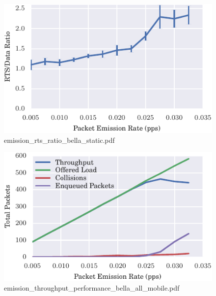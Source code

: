 \documentclass{article}
\begin{document}
\begin{figure}[h!]
\centering
\includegraphics[width=\linewidth]{emission_rts_ratio_bella_static.pdf}
\caption{emission\_rts\_ratio\_bella\_static.pdf}
\end{figure}




\begin{figure}[h!]
\centering
\includegraphics[width=\linewidth]{emission_throughput_performance_bella_all_mobile.pdf}
\caption{emission\_throughput\_performance\_bella\_all\_mobile.pdf}
\end{figure}
\end{document}
